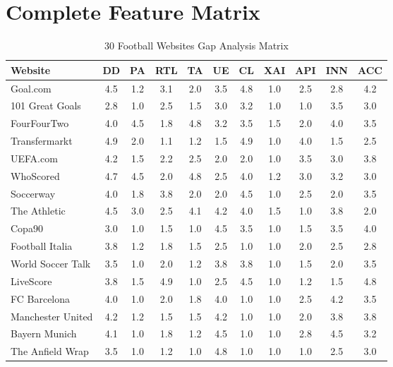\section{Complete Feature Matrix}
\begin{table}[h!]
    \centering
    \caption{30 Football Websites Gap Analysis Matrix}
    \label{tab:feature-matrix}
    \tiny
    \begin{tabular}{|l|c|c|c|c|c|c|c|c|c|c|}
        \hline
        \textbf{Website} & \textbf{DD} & \textbf{PA} & \textbf{RTL} & \textbf{TA} & \textbf{UE} & \textbf{CL} & \textbf{XAI} & \textbf{API} & \textbf{INN} & \textbf{ACC} \\
        \hline
        Goal.com & 4.5 & 1.2 & 3.1 & 2.0 & 3.5 & 4.8 & 1.0 & 2.5 & 2.8 & 4.2 \\
        101 Great Goals & 2.8 & 1.0 & 2.5 & 1.5 & 3.0 & 3.2 & 1.0 & 1.0 & 3.5 & 3.0 \\
        FourFourTwo & 4.0 & 4.5 & 1.8 & 4.8 & 3.2 & 3.5 & 1.5 & 2.0 & 4.0 & 3.5 \\
        Transfermarkt & 4.9 & 2.0 & 1.1 & 1.2 & 1.5 & 4.9 & 1.0 & 4.0 & 1.5 & 2.5 \\
        UEFA.com & 4.2 & 1.5 & 2.2 & 2.5 & 2.0 & 2.0 & 1.0 & 3.5 & 3.0 & 3.8 \\
        WhoScored & 4.7 & 4.5 & 2.0 & 4.8 & 2.5 & 4.0 & 1.2 & 3.0 & 3.2 & 3.0 \\
        Soccerway & 4.0 & 1.8 & 3.8 & 2.0 & 2.0 & 4.5 & 1.0 & 2.5 & 2.0 & 3.5 \\
        The Athletic & 4.5 & 3.0 & 2.5 & 4.1 & 4.2 & 4.0 & 1.5 & 1.0 & 3.8 & 2.0 \\
        Copa90 & 3.0 & 1.0 & 1.5 & 1.0 & 4.5 & 3.5 & 1.0 & 1.5 & 3.5 & 4.0 \\
        Football Italia & 3.8 & 1.2 & 1.8 & 1.5 & 2.5 & 1.0 & 1.0 & 2.0 & 2.5 & 2.8 \\
        World Soccer Talk & 3.5 & 1.0 & 2.0 & 1.2 & 3.8 & 3.8 & 1.0 & 1.5 & 2.0 & 3.5 \\
        LiveScore & 3.8 & 1.5 & 4.9 & 1.0 & 2.5 & 4.5 & 1.0 & 1.2 & 1.5 & 4.8 \\
        FC Barcelona & 4.0 & 1.0 & 2.0 & 1.8 & 4.0 & 1.0 & 1.0 & 2.5 & 4.2 & 3.5 \\
        Manchester United & 4.2 & 1.2 & 1.5 & 1.5 & 4.2 & 1.0 & 1.0 & 2.0 & 3.8 & 3.8 \\
        Bayern Munich & 4.1 & 1.0 & 1.8 & 1.2 & 4.5 & 1.0 & 1.0 & 2.8 & 4.5 & 3.2 \\
        The Anfield Wrap & 3.5 & 1.0 & 1.2 & 1.0 & 4.8 & 1.0 & 1.0 & 1.0 & 2.5 & 3.0 \\

\end{tabular}
\end{table}
